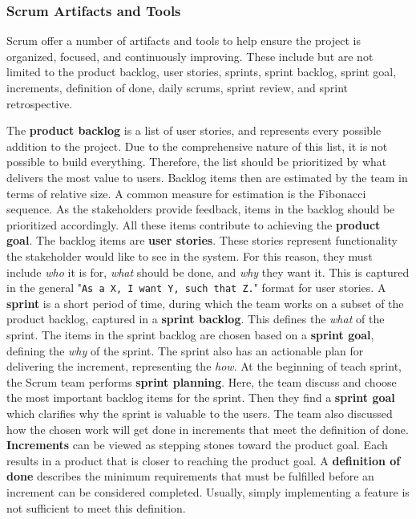 \subsubsection*{Scrum Artifacts and Tools}
Scrum offer a number of artifacts and tools to help ensure the project is organized, focused, and continuously improving. These include but are not limited to the product backlog, user stories, sprints, sprint backlog, sprint goal, increments, definition of done, daily scrums, sprint review, and sprint retrospective.\cite{sutherlandScrumArtDoing2014}

The \textbf{product backlog} is a list of user stories, and represents every possible addition to the project.
Due to the comprehensive nature of this list, it is not possible to build everything.
Therefore, the list should be prioritized by what delivers the most value to users.
Backlog items then are estimated by the team in terms of relative size.
A common measure for estimation is the Fibonacci sequence.
As the stakeholders provide feedback, items in the backlog should be prioritized accordingly.
All these items contribute to achieving the \textbf{product goal}.
The backlog items are \textbf{user stories}.
These stories represent functionality the stakeholder would like to see in the system.
For this reason, they must include \textit{who} it is for, \textit{what} should be done, and \textit{why} they want it.
This is captured in the general "\texttt{As a X, I want Y, such that Z.}" format for user stories.
A \textbf{sprint} is a short period of time, during which the team works on a subset of the product backlog, captured in a \textbf{sprint backlog}.
This defines the \textit{what} of the sprint.
The items in the sprint backlog are chosen based on a \textbf{sprint goal}, defining the \textit{why} of the sprint.
The sprint also has an actionable plan for delivering the increment, representing the \textit{how}.
At the beginning of teach sprint, the Scrum team performs \textbf{sprint planning}.
Here, the team discuss and choose the most important backlog items for the sprint.
Then they find a \textbf{sprint goal} which clarifies why the sprint is valuable to the users.
The team also discussed how the chosen work will get done in increments that meet the definition of done.
\textbf{Increments} can be viewed as stepping stones toward the product goal.
Each results in a product that is closer to reaching the product goal.
A \textbf{definition of done} describes the minimum requirements that must be fulfilled before an increment can be considered completed.
Usually, simply implementing a feature is not sufficient to meet this definition.
